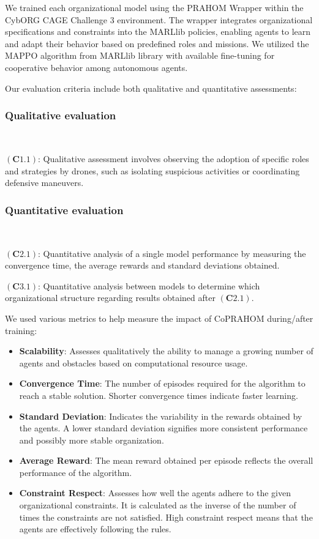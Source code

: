 \documentclass[conference]{IEEEtran}
\begin{document}
We trained each organizational model using the PRAHOM Wrapper within the CybORG CAGE Challenge 3 environment. The wrapper integrates organizational specifications and constraints into the MARLlib policies, enabling agents to learn and adapt their behavior based on predefined roles and missions. We utilized the MAPPO algorithm from MARLlib library with available fine-tuning for cooperative behavior among autonomous agents.

Our evaluation criteria include both qualitative and quantitative assessments:

\subsubsection{Qualitative evaluation}

\

$(\mathbf{C1.1})$: \quad Qualitative assessment involves observing the adoption of specific roles and strategies by drones, such as isolating suspicious activities or coordinating defensive maneuvers.

\subsubsection{Quantitative evaluation}

\

$(\mathbf{C2.1})$: \quad Quantitative analysis of a single model performance by measuring the convergence time, the average rewards and standard deviations obtained.\

$(\mathbf{C3.1})$: \quad Quantitative analysis between  models to determine which organizational structure regarding results obtained after $(\mathbf{C2.1})$.


We used various metrics to help measure the impact of CoPRAHOM during/after training:
\begin{itemize}
    \item \textbf{Scalability}: Assesses qualitatively the ability to manage a growing number of agents and obstacles based on computational resource usage.
    \item \textbf{Convergence Time}: The number of episodes required for the algorithm to reach a stable solution. Shorter convergence times indicate faster learning.
    \item \textbf{Standard Deviation}: Indicates the variability in the rewards obtained by the agents. A lower standard deviation signifies more consistent performance and possibly more stable organization.
    \item \textbf{Average Reward}: The mean reward obtained per episode reflects the overall performance of the algorithm.
    \item \textbf{Constraint Respect}: Assesses how well the agents adhere to the given organizational constraints. It is calculated as the inverse of the number of times the constraints are not satisfied. High constraint respect means that the agents are effectively following the rules.
\end{itemize}
\end{document}
